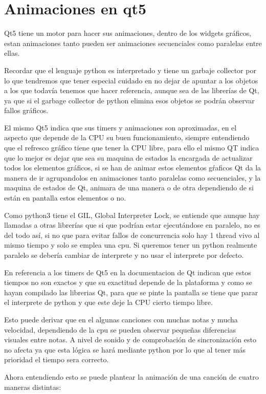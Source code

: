 \documentclass[a4paper,11pt,oneside]{book}
\begin{document}
\section{Animaciones en qt5}
Qt5 tiene un motor para hacer sus animaciones, dentro de los widgets gráficos, estan animaciones tanto pueden ser animaciones secuenciales como paralelas entre ellas.


Recordar que el lenguaje python es interpretado y tiene un garbaje collector por lo que tendremos que tener especial cuidado en no dejar de apuntar a los objetos a los que todavía tenemos que hacer referencia, aunque sea de las librerías de Qt, ya que si el garbage collector de python elimina esos objetos se podrán observar fallos gráficos.

El mismo Qt5 indica que sus timers y animaciones son aproximadas, en el aspecto que depende de la CPU su buen funcionamiento, siempre entendiendo que el refresco gráfico tiene que tener la CPU libre, para ello el mismo QT indica que lo mejor es dejar que sea su maquina de estados la encargada de actualizar todos los elementos gráficos, si se han de animar estos elementos gŕaficos Qt da la manera de ir agrupandolos en animaciones tanto paralelas como secuenciales, y la maquina de estados de Qt, animara de una manera o de otra dependiendo de si están en pantalla estos elementos o no.

Como python3 tiene el GIL, Global Interpreter Lock, se entiende que aunque hay llamadas a otras librerías que si que podrían estar ejecutándose en paralelo, no es del todo así, si no que para evitar fallos de concurrencia solo hay 1 thread vivo al mismo tiempo y solo se emplea una cpu. Si queremos tener un python realmente paralelo se debería cambiar de interprete y no usar el interprete por defecto.

En referencia a los timers de Qt5 en la documentacion de Qt indican que estos tiempos no son exactos y que su exactitud depende de la plataforma y como se hayan compilado las librerias Qt, para que se pinte la pantalla se tiene que parar el interprete de python y que este deje la CPU cierto tiempo libre.

Esto puede derivar que en el algunas canciones con muchas notas y mucha velocidad, dependiendo de la cpu se pueden observar pequeñas diferencias visuales entre notas. A nivel de sonido y de comprobación de sincronización esto no afecta ya que esta lógica se hará mediante python por lo que al tener más prioridad el tiempo sera correcto.

Ahora entendiendo esto se puede plantear la animación de una canción de cuatro maneras distintas:
\end{document}
